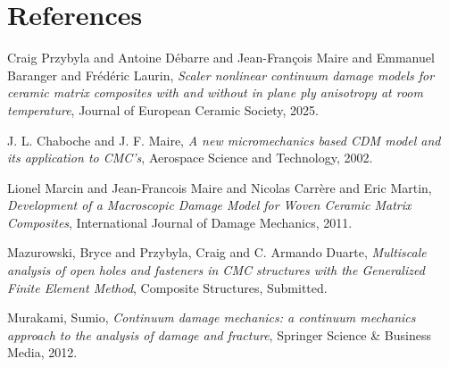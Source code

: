 \documentclass[11pt]{article}
\begin{document}
\section{References}
\label{sec:org3207239}
\noindent
[1] Craig Przybyla and Antoine D\'{e}barre and Jean-Fran\c{c}ois Maire and Emmanuel Baranger and Fr\'{e}d\'{e}ric Laurin, \emph{Scaler nonlinear continuum damage models for ceramic matrix composites with and without in plane ply anisotropy at room temperature}, Journal of European Ceramic Society, 2025.

\noindent
[2] J. L. Chaboche and J. F. Maire, \emph{A new micromechanics based {CDM} model and its application to {CMC}'s}, Aerospace Science and Technology, 2002.

\noindent
[3] Lionel Marcin and Jean-Francois Maire and Nicolas Carr\`{e}re and Eric Martin, \emph{Development of a Macroscopic Damage Model for Woven Ceramic Matrix Composites}, International Journal of Damage Mechanics, 2011.

\noindent
[4] Mazurowski, Bryce and Przybyla, Craig and C. Armando Duarte, \emph{Multiscale analysis of open holes and fasteners in {CMC} structures with the Generalized Finite Element Method}, Composite Structures, Submitted.

\noindent
[5] Murakami, Sumio, \emph{Continuum damage mechanics: a continuum mechanics approach to the analysis of damage and fracture}, Springer Science \& Business Media, 2012.
\end{document}
